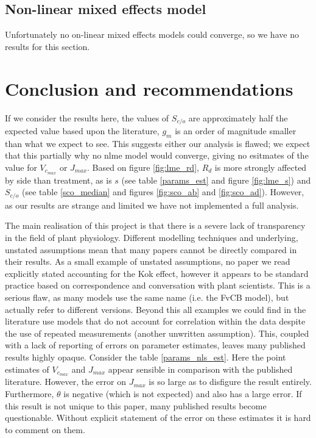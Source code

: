 \documentclass[11pt]{article} %
\begin{document}
\subsection{Non-linear mixed effects model}
Unfortunately no on-linear mixed effects models could converge, so we have no results for this section.

\section{Conclusion and recommendations}
If we consider the results here, the values of $S_{c/o}$ are approximately half the expected value based upon the literature, $g_m$ is an order of magnitude smaller than what we expect to see. This suggests either our analysis is flawed; we expect that this partially why no nlme model would converge, giving no esitmates of the value for $V_{c_{max}}$ or $J_{max}$. Based on figure \ref{fig:lme_rd}, $R_d$ is more strongly affected by side than treatment, as is $s$ (see table \ref{params_est} and figure \ref{fig:lme_s}) and $S_{c/o}$ (see table \ref{sco_median} and figures \ref{fig:sco_ab} and \ref{fig:sco_ad}). However, as our results are strange and limited we have not implemented a full analysis.

The main realisation of this project is that there is a severe lack of transparency in the field of plant physiology. Different modelling techniques and underlying, unstated assumptions mean that many papers cannot be directly compared in their results. As a small example of unstated assumptions, no paper we read explicitly stated accounting for the Kok effect, however it appears to be standard practice based on correspondence and conversation with plant scientists. This is a serious flaw, as many models use the same name (i.e. the FvCB model), but actually refer to different versions. Beyond this all examples we could find in the literature use models that do not account for correlation within the data despite the use of repeated measurements (another unwritten assumption). This, coupled with a lack of reporting of errors on parameter estimates, leaves many published results highly opaque. Consider the table \ref{params_nls_est}. Here the point estimates of $V_{c_{max}}$ and $J_{max}$ appear sensible in comparison with the published literature. However, the error on $J_{max}$ is so large as to disfigure the result entirely. Furthermore, $\theta$ is negative (which is not expected) and also has a large error. If this result is not unique to this paper, many published results become questionable. Without explicit statement of the error on these estimates it is hard to comment on them.
\end{document}
